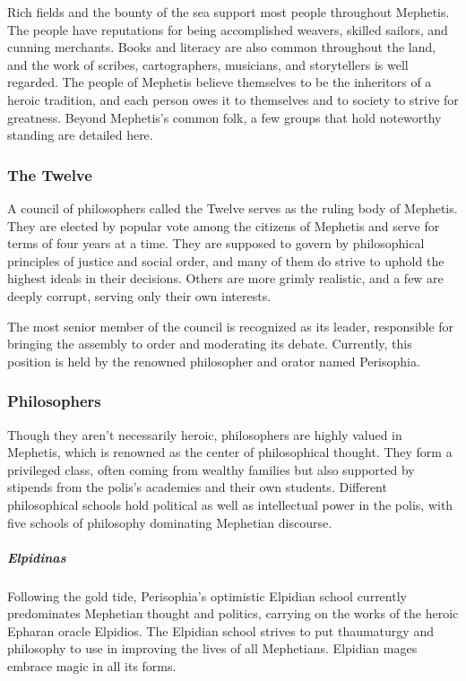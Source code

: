     Rich fields and the bounty of the sea support most people throughout Mephetis.
    The people have reputations for being accomplished weavers, skilled sailors, and cunning merchants.
    Books and literacy are also common throughout the land, and the work of scribes, cartographers, musicians, and storytellers is well regarded.
    The people of Mephetis believe themselves to be the inheritors of a heroic tradition, and each person owes it to themselves and to society to strive for greatness.
    Beyond Mephetis's common folk, a few groups that hold noteworthy standing are detailed here.

    \subsubsection{The Twelve}
        A council of philosophers called the Twelve serves as the ruling body of Mephetis.
        They are elected by popular vote among the citizens of Mephetis and serve for terms of four years at a time.
        They are supposed to govern by philosophical principles of justice and social order, and many of them do strive to uphold the highest ideals in their decisions.
        Others are more grimly realistic, and a few are deeply corrupt, serving only their own interests.

        The most senior member of the council is recognized as its leader, responsible for bringing the assembly to order and moderating its debate.
        Currently, this position is held by the renowned philosopher and orator named Perisophia.

    \subsubsection{Philosophers}
        Though they aren't necessarily heroic, philosophers are highly valued in Mephetis, which is renowned as the center of philosophical thought.
        They form a privileged class, often coming from wealthy families but also supported by stipends from the polis's academies and their own students.
        Different philosophical schools hold political as well as intellectual power in the polis, with five schools of philosophy dominating Mephetian discourse.

        \subparagraph{Elpidinas} Following the gold tide, Perisophia's optimistic Elpidian school currently predominates Mephetian thought and politics, carrying on the works of the heroic Epharan oracle Elpidios.
        The Elpidian school strives to put thaumaturgy and philosophy to use in improving the lives of all  Mephetians.
        Elpidian mages embrace magic in all its forms.

